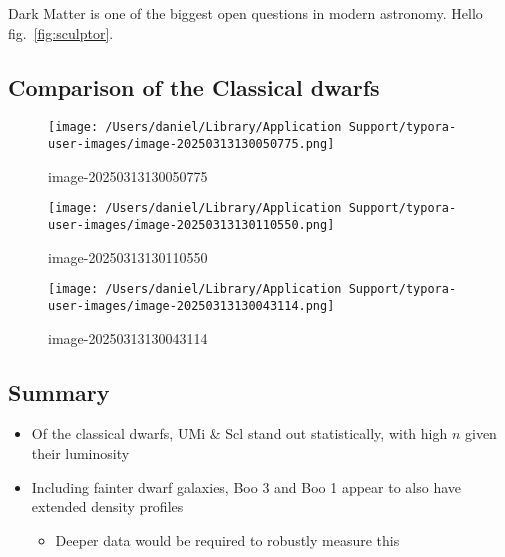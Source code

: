 Dark Matter is one of the biggest open questions in modern astronomy.
Hello fig.~\ref{fig:sculptor}.

\subsection{Comparison of the Classical
dwarfs}\label{comparison-of-the-classical-dwarfs}

\begin{figure}
\centering
\texttt{[image: /Users/daniel/Library/Application Support/typora-user-images/image-20250313130050775.png]}
\caption{image-20250313130050775}
\end{figure}

\begin{figure}
\centering
\texttt{[image: /Users/daniel/Library/Application Support/typora-user-images/image-20250313130110550.png]}
\caption{image-20250313130110550}
\end{figure}

\begin{figure}
\centering
\texttt{[image: /Users/daniel/Library/Application Support/typora-user-images/image-20250313130043114.png]}
\caption{image-20250313130043114}
\end{figure}

\subsection{Summary}\label{summary}

\begin{itemize}
\tightlist
\item
  Of the classical dwarfs, UMi \& Scl stand out statistically, with high
  \(n\) given their luminosity
\item
  Including fainter dwarf galaxies, Boo 3 and Boo 1 appear to also have
  extended density profiles

  \begin{itemize}
  \tightlist
  \item
    Deeper data would be required to robustly measure this
  \end{itemize}
\end{itemize}
